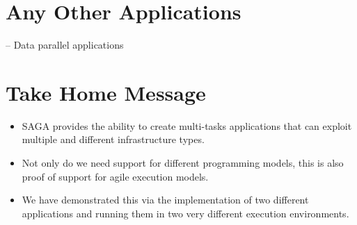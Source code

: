 \documentclass[conference,final]{IEEEtran}
\begin{document}
\section{Any Other Applications}

 -- Data parallel applications

\section{Take Home Message}

\begin{itemize}
\item  SAGA provides the ability to create multi-tasks applications that
  can exploit multiple and different infrastructure types.

\item Not only do we need support for different programming models, 
this is also proof of support for agile execution models.

\item We have demonstrated this via the implementation of two
  different applications and running them in two very different
  execution environments.
\end{itemize}







  
  
\end{document}
